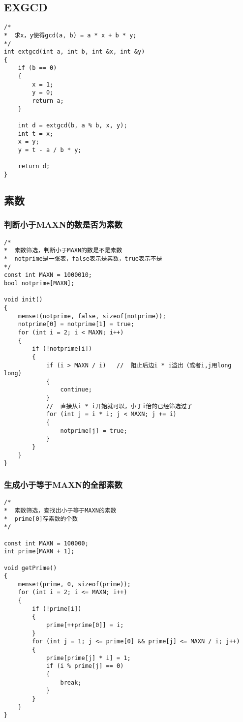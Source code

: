 \subsection{EXGCD}
\begin{lstlisting}
/*
*  求x，y使得gcd(a, b) = a * x + b * y;
*/
int extgcd(int a, int b, int &x, int &y)
{
	if (b == 0)
	{
		x = 1;
		y = 0;
		return a;
	}

	int d = extgcd(b, a % b, x, y);
	int t = x;
	x = y;
	y = t - a / b * y;

	return d;
}
\end{lstlisting}

\subsection{素数}
\subsubsection{判断小于MAXN的数是否为素数}
\begin{lstlisting}
/*
*  素数筛选，判断小于MAXN的数是不是素数
*  notprime是一张表，false表示是素数，true表示不是
*/
const int MAXN = 1000010;
bool notprime[MAXN];

void init()
{
	memset(notprime, false, sizeof(notprime));
	notprime[0] = notprime[1] = true;
	for (int i = 2; i < MAXN; i++)
	{
		if (!notprime[i])
		{
			if (i > MAXN / i)   //  阻止后边i * i溢出（或者i,j用long long)
			{
				continue;
			}
			//  直接从i * i开始就可以，小于i倍的已经筛选过了
			for (int j = i * i; j < MAXN; j += i)
			{
				notprime[j] = true;
			}
		}
	}
}
\end{lstlisting}

\subsubsection{生成小于等于MAXN的全部素数}
\begin{lstlisting}
/*
*  素数筛选，查找出小于等于MAXN的素数
*  prime[0]存素数的个数
*/

const int MAXN = 100000;
int prime[MAXN + 1];

void getPrime()
{
	memset(prime, 0, sizeof(prime));
	for (int i = 2; i <= MAXN; i++)
	{
		if (!prime[i])
		{
			prime[++prime[0]] = i;
		}
		for (int j = 1; j <= prime[0] && prime[j] <= MAXN / i; j++)
		{
			prime[prime[j] * i] = 1;
			if (i % prime[j] == 0)
			{
				break;
			}
		}
	}
}
\end{lstlisting}

